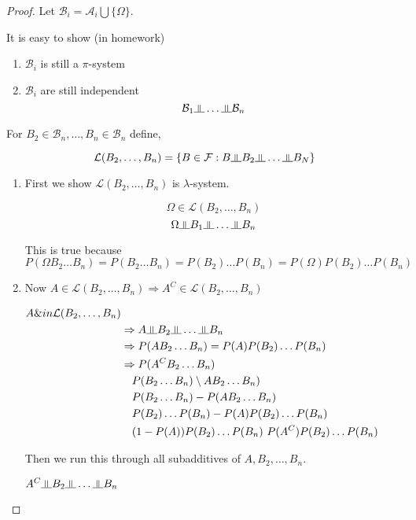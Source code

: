\documentclass[11pt,fleqn]{book} %
\newcommand{\indep}{\rotatebox[origin=c]{90}{$\models$}}
\begin{document}
\begin{proof}
	Let $\mathcal{B}_i = \mathcal{A}_i \bigcup \{\Omega\}$. 

	It is easy to show (in homework)

	\begin{enumerate}
		\item $\mathcal{B}_i$ is still a $\pi$-system
		\item $\mathcal{B}_i$ are still independent
		$$\mathcal{B}_1 \indep \dots \indep \mathcal{B}_n $$
	\end{enumerate}

	For $B_2 \in \mathcal{B}_n, \dots, B_n \in \mathcal{B}_n$ define, 

	$$\mathcal{L}(B_2, \dots, B_n) = \{B \in \mathcal{F}: B \indep B_2 \indep \dots \indep B_N \}$$


	\begin{enumerate}
		\item First we show $\mathcal{L}(B_2, \dots, B_n)$ is $\lambda$-system. 

	$$\Omega \in \mathcal{L}(B_2, \dots, B_n) $$
	$$\Omega \indep B_1 \indep \dots \indep B_n $$

	This is true because $P(\Omega B_2 \dots B_n) = P(B_2 \dots B_n) = P(B_2)\dots P(B_n) = P(\Omega)P(B_2)\dots P(B_n)$
		\item Now $A \in \mathcal{L}(B_2, \dots, B_n) \Rightarrow A^C \in \mathcal{L}(B_2, \dots, B_n)$

		$\begin{aligned}
				A \&in \mathcal{L}(B_2, \dots, B_n)\\
				&\Rightarrow A \indep B_2 \indep \dots \indep B_n	\\
				&\Rightarrow P(A B_2 \dots B_n) = P(A)P(B_2)\dots P(B_n)\\
				&\Rightarrow P(A^C B_2 \dots B_n)\\
				&\quad P(B_2 \dots B_n) \setminus A B_2 \dots B_n)\\
				&\quad P(B_2 \dots B_n) - P(A B_2 \dots B_n)\\
				&\quad P(B_2)\dots P(B_n) - P(A)P(B_2)\dots P(B_n)\\
				&\quad (1-P(A))P(B_2) \dots P(B_n) \ P(A^C)P(B_2)\dots P(B_n)\\
		\end{aligned}$

		Then we run this through all subadditives of $A, B_2, \dots, B_n$. 

		$A^C \indep B_2 \indep \dots \indep B_n$


\end{enumerate}
\end{proof}
\end{document}
